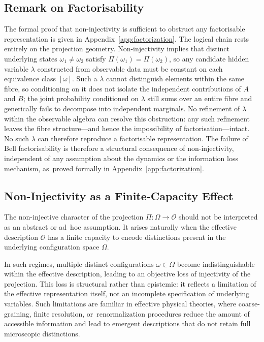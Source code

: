 \documentclass[11pt,a4paper]{article}
\theoremstyle{remark}
\begin{document}
    \subsection{Remark on Factorisability}
      The formal proof that non-injectivity is sufficient to obstruct any
      factorisable representation is given in Appendix~\ref{app:factorization}.
      The logical chain rests entirely on the projection geometry.
      Non-injectivity implies that distinct underlying states $\omega_1 \neq \omega_2$ satisfy
      $\Pi(\omega_1) = \Pi(\omega_2)$, so any candidate hidden variable $\lambda$ constructed
      from observable data must be constant on each equivalence class $[\omega]$.
      Such a $\lambda$ cannot distinguish elements within the same fibre, so conditioning
      on it does not isolate the independent contributions of $A$ and $B$; the joint
      probability conditioned on $\lambda$ still sums over an entire fibre and generically
      fails to decompose into independent marginals.
      No refinement of $\lambda$ within the observable algebra can resolve this obstruction:
      any such refinement leaves the fibre structure---and hence the impossibility of
      factorisation---intact.
      No such $\lambda$ can therefore reproduce a factorisable representation.
      The failure of Bell factorisability is therefore a structural consequence of
      non-injectivity, independent of any assumption about the dynamics or the information
      loss mechanism, as~proved formally in Appendix~\ref{app:factorization}.

  \subsection{Non-Injectivity as a Finite-Capacity Effect}

  The non-injective character of the projection
  $\Pi : \Omega \to \mathcal{O}$ should not be interpreted as an abstract or ad~hoc assumption.
  It arises naturally when the effective description $\mathcal{O}$ has a finite
  capacity to encode distinctions present in the underlying configuration space $\Omega$.

  In such regimes, multiple distinct configurations $\omega \in \Omega$ become
  indistinguishable within the effective description, leading to an objective loss
  of injectivity of the projection.
  This loss is structural rather than epistemic: it reflects a limitation of the
  effective representation itself, not an incomplete specification of underlying variables.
  Such limitations are familiar in effective physical theories, where coarse-graining,
  finite resolution, or~renormalization procedures reduce the amount of accessible
  information and lead to emergent descriptions that do not retain full microscopic
  distinctions.
\end{document}
